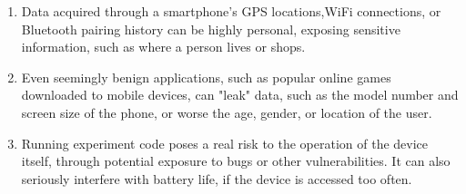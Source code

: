 \begin{enumerate}
\item Data acquired through a smartphone's GPS locations,WiFi
connections, or Bluetooth pairing history can be highly personal,
exposing sensitive information, such as where a person lives or shops\cite{han2012accomplice}.

\item  Even seemingly benign applications, such as popular online games downloaded to mobile devices, can
 "leak" data, such as the model number and screen size of the phone, or worse the age, gender, or location of the user. 

\item Running experiment code poses a real risk to the operation of the device itself, through potential exposure to bugs or other 
vulnerabilities. It can also seriously interfere with battery life, if the device is accessed too often.
\end{enumerate}

